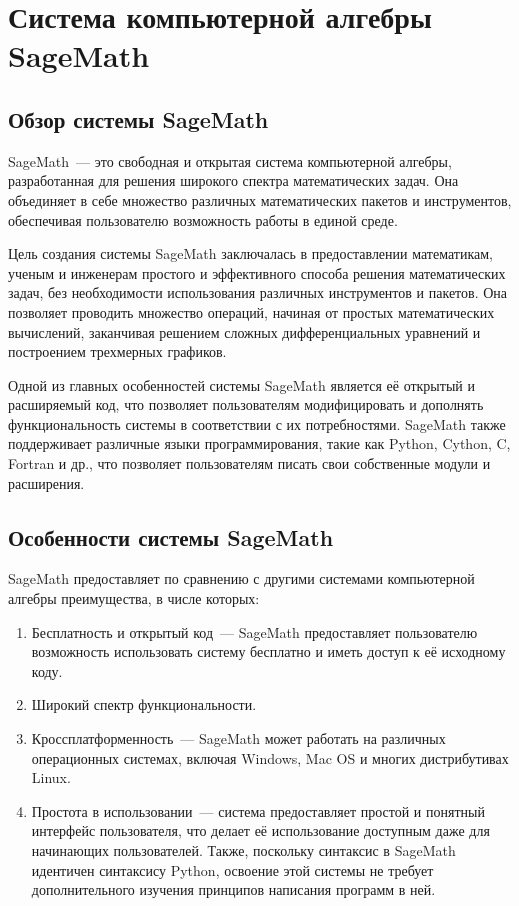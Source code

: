 \newpage
\section{Система компьютерной алгебры SageMath}
    \subsection{Обзор системы SageMath}
        SageMath~--- это свободная и открытая система компьютерной алгебры, 
        разработанная для решения широкого спектра математических задач. 
        Она объединяет в себе множество различных математических пакетов и 
        инструментов, обеспечивая пользователю возможность работы в единой среде.


        Цель создания системы SageMath заключалась в предоставлении математикам, 
        ученым и инженерам простого и эффективного способа решения математических 
        задач, без необходимости использования различных инструментов и пакетов. 
        Она позволяет проводить множество операций, начиная от простых 
        математических вычислений, заканчивая решением сложных дифференциальных 
        уравнений и построением трехмерных графиков.


        Одной из главных особенностей системы SageMath является её открытый и 
        расширяемый код, что позволяет пользователям модифицировать и дополнять 
        функциональность системы в соответствии с их потребностями. SageMath также 
        поддерживает различные языки программирования, такие как Python, Cython, 
        C, Fortran и др., что позволяет пользователям писать свои собственные 
        модули и расширения.
    \subsection{Особенности системы SageMath}
        SageMath предоставляет по сравнению с другими системами 
        компьютерной алгебры преимущества, в числе которых:
        \begin{enumerate}
            \item Бесплатность и открытый код~--- SageMath предоставляет 
            пользователю возможность использовать систему бесплатно и 
            иметь доступ к её исходному коду.
            \item Широкий спектр функциональности.
            \item Кроссплатформенность~--- SageMath может работать на 
            различных операционных системах, включая Windows, Mac OS и 
            многих дистрибутивах Linux.
            \item Простота в использовании~--- система предоставляет простой и 
            понятный интерфейс пользователя, что делает её использование 
            доступным даже для начинающих пользователей. Также, поскольку синтаксис в 
            SageMath идентичен синтаксису Python, освоение этой системы не требует 
            дополнительного изучения принципов написания программ в ней.
        \end{enumerate}
